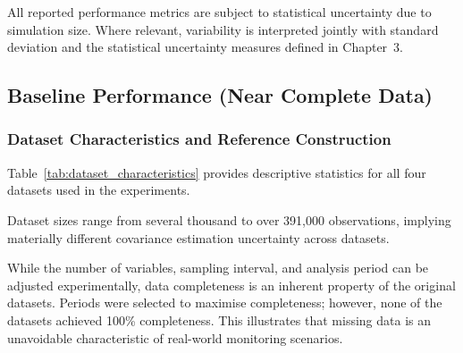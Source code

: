 All reported performance metrics are subject to statistical uncertainty due to simulation size. Where relevant, variability is interpreted jointly with standard deviation and the statistical uncertainty measures defined in Chapter~3.


\subsection{Baseline Performance (Near Complete Data)}

\subsubsection{Dataset Characteristics and Reference Construction}

Table~\ref{tab:dataset_characteristics} provides descriptive statistics for all four datasets used in the experiments.


\begin{table}[htbp]
\centering
\caption{Characteristics of experimental datasets.}
\label{tab:dataset_characteristics}
\end{table}

Dataset sizes range from several thousand to over 391,000 observations, implying materially different covariance estimation uncertainty across datasets.

While the number of variables, sampling interval, and analysis period can be adjusted experimentally, data completeness is an inherent property of the original datasets. Periods were selected to maximise completeness; however, none of the datasets achieved 100\% completeness. This illustrates that missing data is an unavoidable characteristic of real-world monitoring scenarios.

